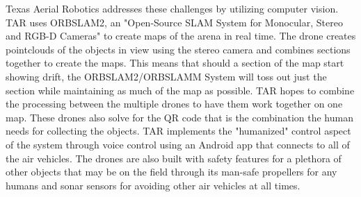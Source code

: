 \documentclass[12pt,letterpaper]{article}
\begin{document}
	Texas Aerial Robotics addresses these challenges by utilizing computer vision. TAR uses ORBSLAM2, an "Open-Source SLAM System for Monocular, Stereo and RGB-D Cameras" to create maps of the arena in real time. The drone creates pointclouds of the objects in view using the stereo camera and combines sections together to create the maps. This means that should a section of the map start showing drift, the ORBSLAM2/ORBSLAMM System will toss out just the section while maintaining as much of the map as possible. TAR hopes to combine the processing between the multiple drones to have them work together on one map. These drones also solve for the QR code that is the combination the human needs for collecting the objects. TAR implements the "humanized" control aspect of the system through voice control using an Android app that connects to all of the air vehicles. The drones are also built with safety features for a plethora of other objects that may be on the field through its man-safe propellers for any humans and sonar sensors for avoiding other air vehicles at all times.
\end{document}
